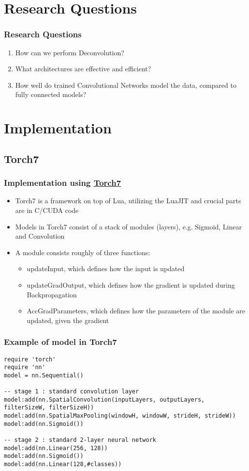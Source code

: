 \documentclass{beamer}
\begin{document}
\section{Research Questions}
\begin{frame}
\frametitle{Research Questions}
\begin{enumerate}
	\item How can we perform Deconvolution?
	\item What architectures are effective and efficient?
	\item How well do trained Convolutional Networks model the data, compared to fully connected models?
\end{enumerate}
\end{frame}

\section{Implementation}

\subsection{Torch7}
\begin{frame}
\frametitle{Implementation using \href{http://torch.ch/}{Torch7}}
\begin{itemize}
	\item Torch7 is a framework on top of Lua, utilizing the LuaJIT and crucial parts are in C/CUDA code
	\item Models in Torch7 consist of a stack of modules (layers), e.g. Sigmoid, Linear and Convolution
	\item A module consists roughly of three functions:
		\begin{itemize}
			\item updateInput, which defines how the input is updated
			\item updateGradOutput, which defines how the gradient is updated during Backpropagation
			\item AccGradParameters, which defines how the parameters of the module are updated, given the gradient
		\end{itemize}
\end{itemize}
\end{frame}

\begin{frame}[fragile]
\frametitle{Example of model in Torch7}
\begin{lstlisting}
require 'torch'
require 'nn'
model = nn.Sequential()

-- stage 1 : standard convolution layer
model:add(nn.SpatialConvolution(inputLayers, outputLayers, filterSizeW, filterSizeH))
model:add(nn.SpatialMaxPooling(windowH, windowW, strideH, strideW))
model:add(nn.Sigmoid())

-- stage 2 : standard 2-layer neural network
model:add(nn.Linear(256, 128))
model:add(nn.Sigmoid())
model:add(nn.Linear(128,#classes))
\end{lstlisting}
\end{frame}
\end{document}
